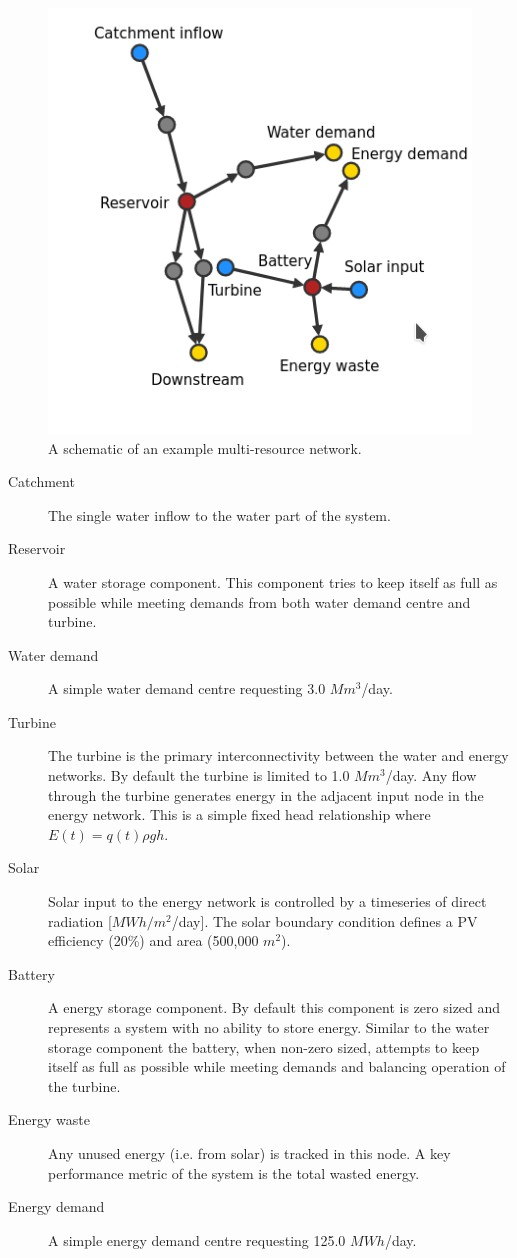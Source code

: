 \documentclass[11pt,twoside,a4paper]{article}
\begin{document}
\begin{figure}
    \centering
    \includegraphics{schematic.png}
    \caption{A schematic of an example multi-resource network.}
    \label{fig:schematic}
\end{figure}

\begin{description}
    \item[Catchment] The single water inflow to the water part of the system. 
    \item[Reservoir] A water storage component. This component tries to keep itself as full as possible while meeting demands from both water demand centre and turbine. 
    \item[Water demand] A simple water demand centre requesting 3.0 $Mm^3$/day.
    \item[Turbine] The turbine is the primary interconnectivity between the water and energy networks. By default the turbine is limited to 1.0 $Mm^3$/day. Any flow through the turbine generates energy in the adjacent input node in the energy network. This is a simple fixed head relationship where $E(t) = q(t)\rho gh$. 
    \item[Solar] Solar input to the energy network is controlled by a timeseries of direct radiation [$MWh/m^2$/day]. The solar boundary condition defines a PV efficiency (20\%) and area (500,000 $m^2$). 
    \item[Battery] A energy storage component. By default this component is zero sized and represents a system with no ability to store energy. Similar to the water storage component the battery, when non-zero sized, attempts to keep itself as full as possible while meeting demands and balancing operation of the turbine.
    \item[Energy waste] Any unused energy (i.e. from solar) is tracked in this node. A key performance metric of the system is the total wasted energy. 
    \item[Energy demand] A simple energy demand centre requesting 125.0 $MWh$/day.
\end{description}
\end{document}
